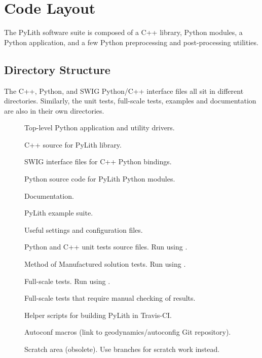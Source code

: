 \section{Code Layout}
\label{sec:code:layout}

The PyLith software suite is composed of a C++ library, Python
modules, a Python application, and a few Python preprocessing and
post-processing utilities.

\subsection{Directory Structure}

The C++, Python, and SWIG Python/C++ interface files all sit in
different directories. Similarly, the unit tests, full-scale tests,
examples and documentation are also in their own directories.

\begin{description}
\item[] Top-level Python application and
  utility drivers.
\item[] C++ source for PyLith library.
\item[] SWIG interface files for C++ Python
  bindings.
\item[] Python source code for PyLith Python modules.
\item[] Documentation.
\item[] PyLith example suite.
\item[] Useful settings and configuration files.
\item[] Python and C++ unit tests source
  files. Run using .
\item[] Method of Manufactured solution tests. Run using
  .
\item[] Full-scale tests. Run using
  .
\item[] Full-scale tests that require manual checking
  of results.
\item[] Helper scripts for building PyLith in
  Travis-CI.
\item[] Autoconf macros (link to
  geodynamics/autoconfig Git repository).
\item[] Scratch area (obsolete). Use branches for
  scratch work instead.
\end{description}

